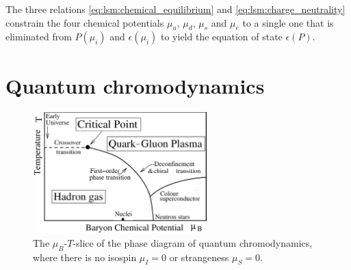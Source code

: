 The three relations \eqref{eq:lsm:chemical_equilibrium} and \eqref{eq:lsm:charge_neutrality}
constrain the four chemical potentials $\mu_u$, $\mu_d$, $\mu_s$ and $\mu_e$
to a single one that is eliminated from $P(\mu_i)$ and $\epsilon(\mu_i)$
to yield the equation of state $\epsilon(P)$.

\section{Quantum chromodynamics}
\label{sec:master_intro:qcd}

\begin{figure}[t]
\centering
\includegraphics[width=0.6\textwidth]{figures/qcd-phase-diagram.png}
\caption{%
	The $\mu_B$-$T$-slice of the phase diagram of quantum chromodynamics,
	where there is no isospin $\mu_I=0$ or strangeness $\mu_S=0$.
}
\label{fig:qcd:phase_diagram}
\end{figure}

